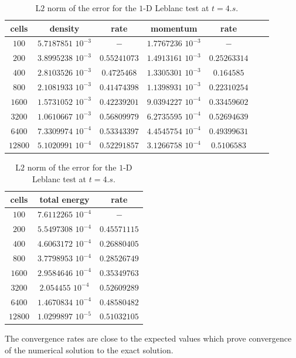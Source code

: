 \documentclass[preprint,10pt]{elsarticle}
\begin{document}
\begin{table}[H]
\begin{center}
 \caption{\label{tbl:l2_norm_leblanc} L$2$ norm of the error for the $1$-D Leblanc test at $t=4.s$.}
 \begin{tabular}{|c|c|c|c|c|c|c|}
 \hline
   cells & density & rate & momentum & rate \\
 \hline
$100$ &   $5.7187851$ $10^{-3}$ & $-$ & $1.7767236$ $10^{-3}$ & $-$ \\
  \hline
$200$  &  $3.8995238$ $10^{-3}$ & $0.55241073$ & $1.4913161$ $10^{-3}$ & $0.25263314$ \\
   \hline
$400$ & $2.8103526$ $10^{-3}$   & $0.4725468$ & $1.3305301$ $10^{-3}$ & $0.164585$ \\
 \hline
$800$ & $2.1081933$ $10^{-3}$   & $0.41474398$ & $1.1398931$ $10^{-3}$ & $0.22310254$ \\
 \hline
$1600$ & $1.5731052$ $10^{-3}$  & $0.42239201$ & $9.0394227$ $10^{-4}$ & $0.33459602$ \\
 \hline
$3200$&$1.0610667$ $10^{-3}$    & $0.56809979$ & $6.2735595$ $10^{-4}$ & $0.52694639$ \\
 \hline
$6400$&$7.3309974$ $10^{-4}$    & $0.53343397$ & $4.4545754$ $10^{-4}$ & $0.49399631$ \\
 \hline
 $12800$&$5.1020991$ $10^{-4}$  & $0.52291857$ & $3.1266758$ $10^{-4}$ & $0.5106583$ \\
 \hline
\end{tabular}
\begin{tabular}{|c|c|c|}
\hline
cells & total energy & rate \\ \hline
$100$ & $7.6112265$  $10^{-4}$& $-$\\ \hline
$200$ & $5.5497308$ $10^{-4}$& $0.45571115$\\ \hline
$400$ & $4.6063172$ $10^{-4}$ & $0.26880405$\\ \hline
$800$ & $3.7798953$ $10^{-4}$ & $0.28526749$\\ \hline
$1600$ & $2.9584646$ $10^{-4}$ & $0.35349763$\\ \hline
$3200$ & $2.054455$ $10^{-4}$ & $0.52609289$\\ \hline
$6400$ & $1.4670834$ $10^{-4}$ & $0.48580482$\\ \hline
$12800$ & $1.0299897$ $10^{-5}$ & $0.51032105$\\  \hline
\end{tabular}
\end{center}
\nonumber
\end{table}
The convergence rates are close to the expected values which prove convergence of the numerical solution to the exact solution.
\end{document}
